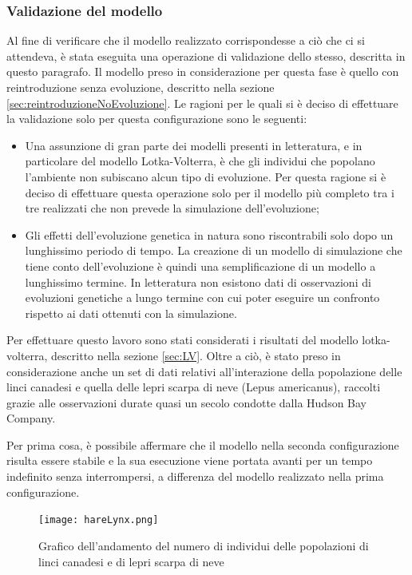 \documentclass[11pt]{article}
\begin{document}
\subsubsection{Validazione del modello}
Al fine di verificare che il modello realizzato corrispondesse a ciò che ci si attendeva, è stata eseguita una operazione di validazione dello stesso, descritta in questo paragrafo.
Il modello preso in considerazione per questa fase è quello con reintroduzione senza evoluzione, descritto nella sezione \ref{sec:reintroduzioneNoEvoluzione}. 
Le ragioni per le quali si è deciso di effettuare la validazione solo per questa configurazione sono le seguenti:
\begin{itemize}
    \item Una assunzione di gran parte dei modelli presenti in letteratura, e in particolare del modello Lotka-Volterra, è che gli individui che popolano l'ambiente non subiscano alcun tipo di evoluzione. Per questa ragione si è deciso di effettuare questa operazione solo per il modello più completo tra i tre realizzati che non prevede la simulazione dell'evoluzione;
    \item Gli effetti dell'evoluzione genetica in natura sono riscontrabili solo dopo un lunghissimo periodo di tempo. La creazione di un modello di simulazione che tiene conto dell'evoluzione è quindi una semplificazione di un modello a lunghissimo termine. In letteratura non esistono dati di osservazioni di evoluzioni genetiche a lungo termine con cui poter eseguire un confronto rispetto ai dati ottenuti con la simulazione.
\end{itemize}
Per effettuare questo lavoro sono stati considerati i risultati del modello lotka-volterra, descritto nella sezione \ref{sec:LV}. Oltre a ciò, è stato preso in considerazione anche un set di dati relativi all'interazione della popolazione delle linci canadesi e quella delle lepri scarpa di neve (Lepus americanus), raccolti grazie alle osservazioni durate quasi un secolo condotte dalla Hudson Bay Company\cite{HareLynxData}.  

Per prima cosa, è possibile affermare che il modello nella seconda configurazione risulta essere stabile e la sua esecuzione viene portata avanti per un tempo indefinito senza interrompersi, a differenza del modello realizzato nella prima configurazione.

\begin{figure}[h!]
     \centering
     \texttt{[image: hareLynx.png]}
     \caption{Grafico dell'andamento del numero di individui delle popolazioni di linci canadesi e di lepri scarpa di neve}
     \label{fig:hareLynx}
\end{figure}
\end{document}
